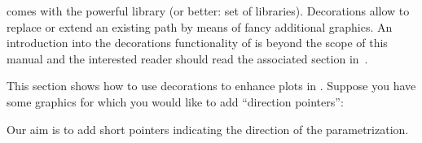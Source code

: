 {

\tikzname{} comes with the powerful  library (or
better: set of libraries). Decorations allow to replace or extend an existing
path by means of fancy additional graphics. An introduction into the
decorations functionality of \tikzname{} is beyond the scope of this manual and
the interested reader should read the associated section in~\cite{tikz}.

This section shows how to use decorations to enhance plots in \PGFPlots{}.
Suppose you have some graphics for which you would like to add ``direction
pointers'':
%
\begin{codeexample}[]
\end{codeexample}
%
\noindent Our aim is to add short pointers indicating the direction of the
parametrization.

}
